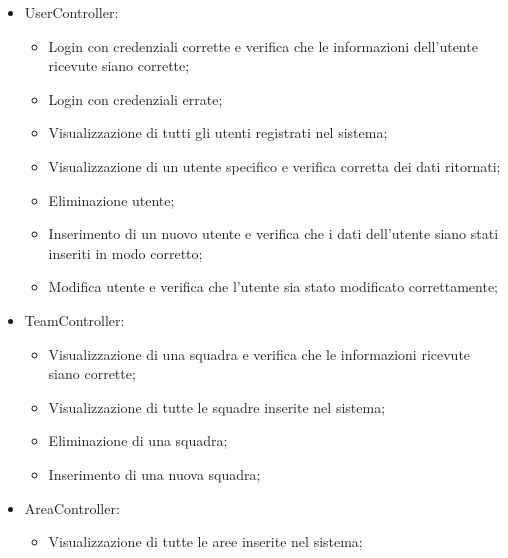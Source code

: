 \begin{itemize}
	\item UserController:
	\begin{itemize}
		\item Login con credenziali corrette e verifica che le informazioni dell'utente ricevute siano corrette;
		\item Login con credenziali errate;
		\item Visualizzazione di tutti gli utenti registrati nel sistema;
		\item Visualizzazione di un utente specifico e verifica corretta dei dati ritornati;
		\item Eliminazione utente;
		\item Inserimento di un nuovo utente e verifica che i dati dell'utente siano stati inseriti in modo corretto;
		\item Modifica utente e verifica che l'utente sia stato modificato correttamente;
	\end{itemize}
	\item TeamController:
	\begin{itemize}
		\item Visualizzazione di una squadra e verifica che le informazioni ricevute siano corrette;
		\item Visualizzazione di tutte le squadre inserite nel sistema;
		\item Eliminazione di una squadra;
		\item Inserimento di una nuova squadra;
	\end{itemize}
	\item AreaController:
	\begin{itemize}
		\item Visualizzazione di tutte le aree inserite nel sistema;
	\end{itemize}


\end{itemize}

